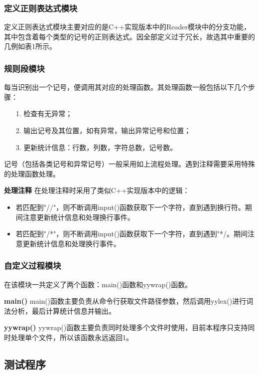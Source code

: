\documentclass[twocolumn]{article}
\begin{document}
\subsubsection{定义正则表达式模块}

定义正则表达式模块主要对应的是C++实现版本中的Reader模块中的分支功能，其中包含着每个类型的记号的正则表达式。因全部定义过于冗长，故选其中重要的几例如表1所示。

\subsubsection{规则段模块}

每当识别出一个记号，便调用其对应的处理函数。其处理函数一般包括以下几个步骤：
\begin{itemize}
	\item[1.]检查有无异常；
	\item[2.]输出记号及其位置，如有异常，输出异常记号和位置；
	\item[3.]更新统计信息：行数，列数，字符总数，记号数。
\end{itemize}

记号（包括各类记号和异常记号）一般采用如上流程处理。遇到注释需要采用特殊的处理函数处理。

\textbf{处理注释 }在处理注释时采用了类似C++实现版本中的逻辑：
\begin{itemize}
	\item 若匹配到"//"，则不断调用input()函数获取下一个字符，直到遇到换行符。期间注意更新统计信息和处理换行事件。
	\item 若匹配到"/*"，则不断调用input()函数获取下一个字符，直到遇到"*/。期间注意更新统计信息和处理换行事件。
\end{itemize}

\subsubsection{自定义过程模块}

在该模块一共定义了两个函数：main()函数和yywrap()函数。

\textbf{main() }main()函数主要负责从命令行获取文件路径参数，然后调用yylex()进行词法分析，最后计算统计信息并输出。

\textbf{yywrap() }yywrap()函数主要负责同时处理多个文件时使用，目前本程序只支持同时处理单个文件，所以该函数永远返回1。

\subsection{测试程序}
\end{document}
